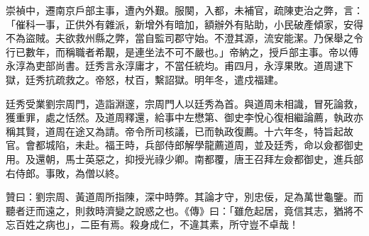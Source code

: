 \begin{pinyinscope}
崇禎中，遷南京戶部主事，遭內外艱。服闋，入都，未補官，疏陳吏治之弊，言：「催科一事，正供外有雜派，新增外有暗加，額辦外有貼助，小民破產傾家，安得不為盜賊。夫欲救州縣之弊，當自監司郡守始。不澄其源，流安能潔。乃保舉之令行已數年，而稱職者希覯，是連坐法不可不嚴也。」帝納之，授戶部主事。帝以傅永淳為吏部尚書。廷秀言永淳庸才，不當任統均。甫四月，永淳果敗。道周逮下獄，廷秀抗疏救之。帝怒，杖百，繫詔獄。明年冬，遣戍福建。

廷秀受業劉宗周門，造詣淵邃，宗周門人以廷秀為首。與道周未相識，冒死論救，獲重罪，處之恬然。及道周釋還，給事中左懋第、御史李悅心復相繼論薦，執政亦稱其賢，道周在途又為請。帝令所司核議，已而執政復薦。十六年冬，特旨起故官。會都城陷，未赴。福王時，兵部侍郎解學龍薦道周，並及廷秀，命以僉都御史用。及還朝，馬士英惡之，抑授光祿少卿。南都覆，唐王召拜左僉都御史，進兵部右侍郎。事敗，為僧以終。

贊曰：劉宗周、黃道周所指陳，深中時弊。其論才守，別忠佞，足為萬世龜鑒。而聽者迂而遠之，則救時濟變之說惑之也。《傳》曰：「雖危起居，竟信其志，猶將不忘百姓之病也」，二臣有焉。殺身成仁，不違其素，所守豈不卓哉！


\end{pinyinscope}
